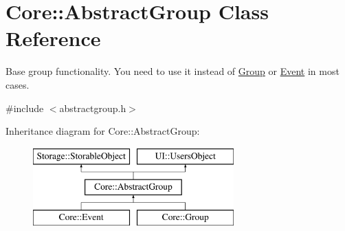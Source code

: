 \hypertarget{classCore_1_1AbstractGroup}{
\section{Core::AbstractGroup Class Reference}
\label{dd/d68/classCore_1_1AbstractGroup}
}


Base group functionality. You need to use it instead of \hyperlink{classCore_1_1Group}{Group} or \hyperlink{classCore_1_1Event}{Event} in most cases.  




{\ttfamily \#include $<$abstractgroup.h$>$}

Inheritance diagram for Core::AbstractGroup:\begin{figure}[H]
\begin{center}
\leavevmode
\includegraphics[height=3.000000cm]{dd/d68/classCore_1_1AbstractGroup}
\end{center}
\end{figure}

